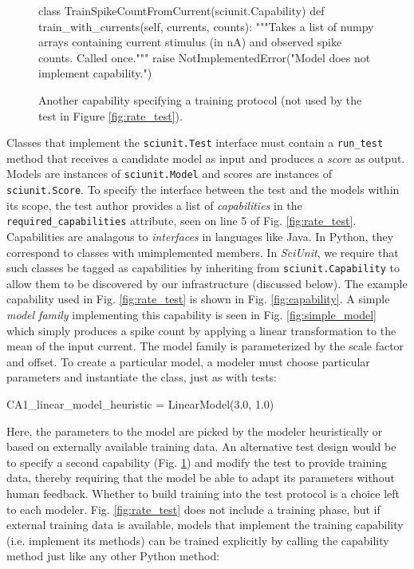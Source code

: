 \documentclass[11pt,letterpaper]{article}
\let\verbx\lstinline
\begin{document}
\begin{figure}
\begin{python}
class TrainSpikeCountFromCurrent(sciunit.Capability)
  def train_with_currents(self, currents, counts):
    """Takes a list of numpy arrays containing current stimulus (in nA) and
    observed spike counts. Called once."""
    raise NotImplementedError("Model does not implement capability.")
\end{python}
\caption{Another capability specifying a training protocol (not used by the test in Figure \ref{fig:rate_test}).}
\label{fig:training}
\end{figure}

Classes that implement the \verbx{sciunit.Test} interface must contain a \verbx{run_test} method that receives a candidate model as input and produces a \textit{score} as output. Models are instances of \verbx{sciunit.Model} and scores are instances of \verbx{sciunit.Score}. To specify the interface between the test and the models within its scope, the test author provides a list of \emph{capabilities} in the \verbx{required_capabilities} attribute, seen on line 5 of Fig. \ref{fig:rate_test}. Capabilities are analagous to \emph{interfaces} in languages like Java. In Python, they correspond to classes with unimplemented members. In \textit{SciUnit}, we require that such classes be tagged as capabilities by inheriting from \verbx{sciunit.Capability} to allow them to be discovered by our infrastructure (discussed below). The example capability used in Fig. \ref{fig:rate_test} is shown in Fig. \ref{fig:capability}. A simple \emph{model family} implementing this capability is seen in Fig. \ref{fig:simple_model} which simply produces a spike count by applying a linear transformation to the mean of the input current. The model family is parameterized by the scale factor and offset. To create a particular model, a modeler must choose particular parameters and instantiate the class, just as with tests:
\begin{python}
CA1_linear_model_heuristic = LinearModel(3.0, 1.0)
\end{python}
Here, the parameters to the model are picked by the modeler heuristically or based on externally available training data. An alternative test design would be to specify a second capability (Fig. \ref{fig:training}) and modify the test to provide training data, thereby requiring that the model be able to adapt its parameters without human feedback. Whether to build training into the test protocol is a choice left to each modeler. Fig. \ref{fig:rate_test} does not include a training phase, but if external training data is available, models that implement the training capability (i.e. implement its methods) can be trained explicitly by calling the capability method just like any other Python method:
\end{document}
